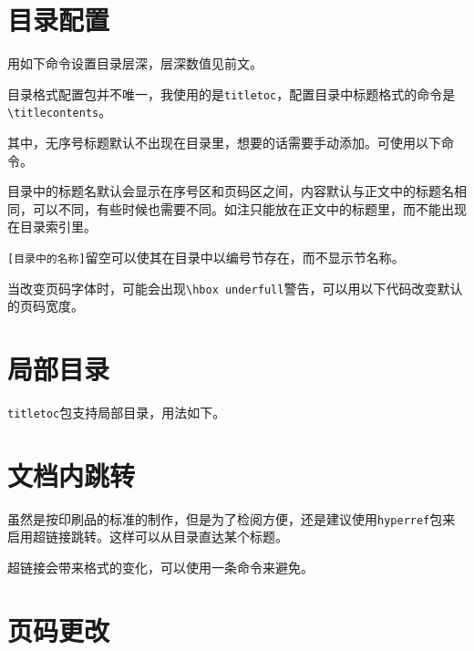 \documentclass[10pt,openany]{book}
\begin{document}
\section{目录配置}

用如下命令设置目录层深，层深数值见前文。



目录格式配置包并不唯一，我使用的是\texttt{titletoc}，配置目录中标题格式的命令是\texttt{\textbackslash{}titlecontents}。



其中，无序号标题默认不出现在目录里，想要的话需要手动添加。可使用以下命令。



目录中的标题名默认会显示在序号区和页码区之间，内容默认与正文中的标题名相同，可以不同，有些时候也需要不同。如注只能放在正文中的标题里，而不能出现在目录索引里。



\texttt{[目录中的名称]}留空可以使其在目录中以编号节存在，而不显示节名称。

当改变页码字体时，可能会出现\texttt{\textbackslash{}hbox\ underfull}警告，可以用以下代码改变默认的页码宽度。



\section{局部目录}

\texttt{titletoc}包支持局部目录，用法如下。



\section{文档内跳转}

虽然是按印刷品的标准的制作，但是为了检阅方便，还是建议使用\texttt{hyperref}包来启用超链接跳转。这样可以从目录直达某个标题。

超链接会带来格式的变化，可以使用一条命令来避免。



\section{页码更改}
\end{document}
